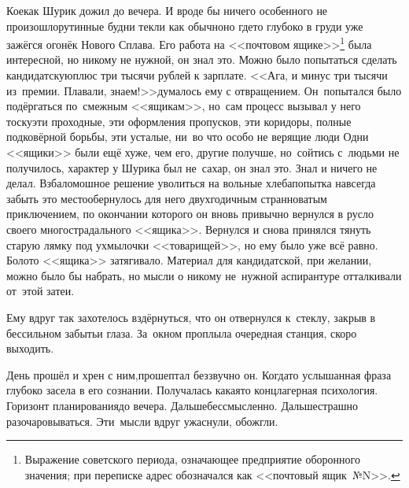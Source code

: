 {%
	Кое\sdash как Шурик дожил до вечера. И вроде бы ничего особенного не произошло\mdash рутинные будни текли как обычно\mdash но где\sdash то глубоко в груди уже зажёгся огонёк Нового Сплава. Его работа на <<почтовом ящике>>\footnote{Выражение советского периода, означающее предприятие оборонного значения; при переписке адрес обозначался как <<почтовый ящик~№N>>.} была интересной, но никому не нужной, он знал это. Можно было попытаться сделать кандидатскую\mdash плюс три тысячи рублей к зарплате. <<Ага, и минус три тысячи из~премии. Плавали, знаем!>>\mdash думалось ему с отвращением. Он~попытался было подёргаться по~смежным <<ящикам>>, но~сам процесс вызывал у него тоску\mdash эти проходные, эти оформления пропусков, эти коридоры, полные подковёрной борьбы, эти усталые, ни~во что особо не верящие люди\myldots{} Одни <<ящики>> были ещё хуже, чем его, другие получше, но~сойтись с~людьми не получилось, характер у Шурика был не~сахар, он знал это. Знал и ничего не делал. Взбаломошное решение уволиться на вольные хлеба\mdash попытка навсегда забыть это место\mdash обернулось для него двухгодичным странноватым приключением, по окончании которого он вновь привычно вернулся в русло своего многострадального <<ящика>>. Вернулся и снова принялся тянуть старую лямку под ухмылочки <<товарищей>>, но ему было уже всё равно. Болото <<ящика>> затягивало. Материал для кандидатской, при желании, можно было бы набрать, но мысли о никому не~нужной аспирантуре отталкивали от~этой затеи.%
	
	Ему вдруг так захотелось вздёрнуться, что он отвернулся к~стеклу, закрыв в бессильном забытьи глаза. За~окном проплыла очередная станция, скоро выходить.
	
	\diagdash День прошёл и хрен с ним,\mdash прошептал беззвучно он. Когда\sdash то услышанная фраза глубоко засела в его сознании. Получалась какая\sdash то концлагерная психология. Горизонт планирования\mdash до вечера. Дальше\mdash бессмысленно. Дальше\mdash страшно разочаровываться. Эти~мысли вдруг ужаснули, обожгли. %
	
}
